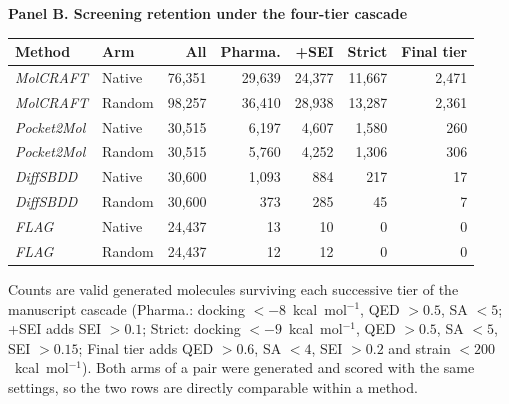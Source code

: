 \begin{samepage}
\textbf{Panel B. Screening retention under the four-tier cascade}
\begin{center}\scriptsize
\setlength{\tabcolsep}{4pt}
\begin{tabular}{@{}llrrrrr@{}}
\toprule
\textbf{Method} & \textbf{Arm} & \textbf{All} & \textbf{Pharma.} & \textbf{+SEI} & \textbf{Strict} & \textbf{Final tier} \\
\midrule
\textit{MolCRAFT} & Native & 76,351 & 29,639 & 24,377 & 11,667 & 2,471 \\
\textit{MolCRAFT} & Random & 98,257 & 36,410 & 28,938 & 13,287 & 2,361 \\
\midrule
\textit{Pocket2Mol} & Native & 30,515 & 6,197 & 4,607 & 1,580 & 260 \\
\textit{Pocket2Mol} & Random & 30,515 & 5,760 & 4,252 & 1,306 & 306 \\
\midrule
\textit{DiffSBDD} & Native & 30,600 & 1,093 & 884 & 217 & 17 \\
\textit{DiffSBDD} & Random & 30,600 & 373 & 285 & 45 & 7 \\
\midrule
\textit{FLAG} & Native & 24,437 & 13 & 10 & 0 & 0 \\
\textit{FLAG} & Random & 24,437 & 12 & 12 & 0 & 0 \\
\midrule
\bottomrule
\end{tabular}\end{center}

\end{samepage}
Counts are valid generated molecules surviving each successive tier of the manuscript cascade (Pharma.: docking $<-8$~kcal~mol$^{-1}$, QED $>0.5$, SA $<5$; +SEI adds SEI $>0.1$; Strict: docking $<-9$~kcal~mol$^{-1}$, QED $>0.5$, SA $<5$, SEI $>0.15$; Final tier adds QED $>0.6$, SA $<4$, SEI $>0.2$ and strain $<200$~kcal~mol$^{-1}$). Both arms of a pair were generated and scored with the same settings, so the two rows are directly comparable within a method.

